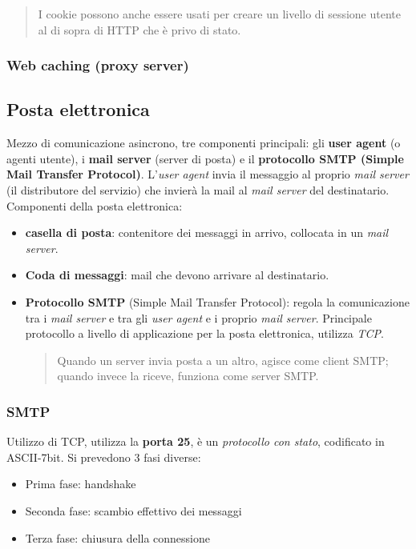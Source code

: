 \begin{quote}
  I cookie possono anche essere usati per creare un livello di sessione utente al di sopra di HTTP che è privo di stato.
\end{quote}

\subsubsection{Web caching (proxy server)}

\subsection{Posta elettronica}
Mezzo di comunicazione asincrono, tre componenti principali: gli \textbf{user agent} (o agenti utente), i \textbf{mail server} (server di posta) e il \textbf{protocollo SMTP (Simple Mail Transfer Protocol)}. 
L'\textit{user agent} invia il messaggio al proprio \textit{mail server} (il distributore del servizio) che invierà la mail al \textit{mail server} del destinatario.
Componenti della posta elettronica:
\begin{itemize}
  \item \textbf{casella di posta}: contenitore dei messaggi in arrivo, collocata in un \textit{mail server}.
  \item \textbf{Coda di messaggi}: mail che devono arrivare al destinatario.
  \item \textbf{Protocollo SMTP} (Simple Mail Transfer Protocol): regola la comunicazione tra i \textit{mail server} e tra gli \textit{user agent} e i proprio \textit{mail server}. Principale protocollo a livello di applicazione per la posta elettronica, utilizza \textit{TCP}.
  \begin{quote}
    Quando un server invia posta a un altro, agisce come client SMTP; quando invece la riceve, funziona come server SMTP.
  \end{quote}
\end{itemize}

\subsubsection{SMTP}
Utilizzo di TCP, utilizza la \textbf{porta 25}, è un \textit{protocollo con stato}, codificato in ASCII-7bit. \newline
Si prevedono 3 fasi diverse:
\begin{itemize}
  \item Prima fase: handshake
  \item Seconda fase: scambio effettivo dei messaggi
  \item Terza fase: chiusura della connessione 
\end{itemize}

